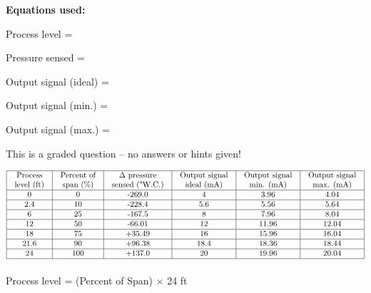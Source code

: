 \noindent
{\bf Equations used:}

\vskip 20pt

Process level = 

\vskip 20pt

Pressure sensed = 

\vskip 20pt

Output signal (ideal) = 

\vskip 20pt

Output signal (min.) = 

\vskip 20pt

Output signal (max.) = 



\vfil 

\eject






This is a graded question -- no answers or hints given!








$$\vbox{\offinterlineskip
\halign{\strut
\vrule \quad\hfil # \ \hfil & 
\vrule \quad\hfil # \ \hfil & 
\vrule \quad\hfil # \ \hfil & 
\vrule \quad\hfil # \ \hfil & 
\vrule \quad\hfil # \ \hfil & 
\vrule \quad\hfil # \ \hfil \vrule \cr
\noalign{\hrule}
%
Process & Percent of & $\Delta$ pressure & Output signal & Output signal & Output signal \cr
%
level (ft) & span (\%) & sensed ("W.C.) & ideal (mA) & min. (mA) & max. (mA) \cr
%
\noalign{\hrule}
%
0  & 0 & -269.0 & 4 & 3.96 & 4.04 \cr
%
\noalign{\hrule}
%
2.4  & 10 & -228.4 & 5.6 & 5.56 & 5.64 \cr
%
\noalign{\hrule}
%
6  & 25 & -167.5 & 8 & 7.96 & 8.04 \cr
%
\noalign{\hrule}
%
12  & 50 & -66.01 & 12 & 11.96 & 12.04 \cr
%
\noalign{\hrule}
%
18  & 75 & +35.49 & 16 & 15.96 & 16.04 \cr
%
\noalign{\hrule}
%
21.6  & 90 & +96.38 & 18.4 & 18.36 & 18.44 \cr
%
\noalign{\hrule}
%
24  & 100 & +137.0 & 20 & 19.96 & 20.04 \cr
%
\noalign{\hrule}
} %
}$$ %

\vskip 10pt

Process level = (Percent of Span) $\times$ 24 ft

